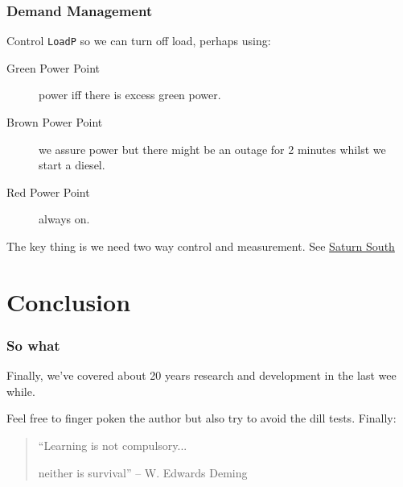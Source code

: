 \documentclass{beamer}
\begin{document}
\begin{frame}\frametitle{Demand Management}
Control \texttt{LoadP} so we can turn off load, perhaps using:

\begin{description}
\item[Green Power Point] power iff there is excess green power.
\item[Brown Power Point] we assure power but there might be an outage
  for 2 minutes whilst we start a diesel.
\item[Red Power Point] always on.
\end{description}

The key thing is we need two way control and measurement.
See \href{http://www.saturnsouth.com}{Saturn South}
\end{frame}

\section{Conclusion}
\begin{frame}\frametitle{So what}
Finally, we've covered about 20 years research and development in
the last wee while.\pause


Feel free to finger poken the author but also try to avoid the dill
tests.
\vfill
\pause
Finally:
\begin{quote}
“Learning is not compulsory...

\pause
neither is survival” – W. Edwards Deming
\end{quote}
\end{frame}
\end{document}
